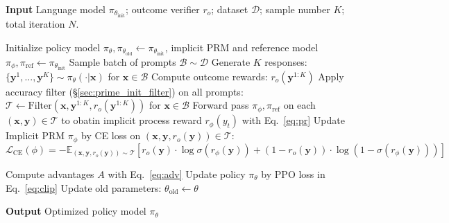 \begin{algorithm}[t]

\caption{Process Reinforcement through Implicit Rewards (PRIME)}
\textbf{Input} Language model $\pi_{\theta_{\text{init}}}$; outcome verifier $r_o$; dataset $\mathcal{D}$; sample number $K$; total iteration $N$.

\begin{algorithmic}[1]
\State Initialize policy model $\pi_\theta, \pi_{\theta_{\text{old}}} \leftarrow \pi_{\theta_{\text{init}}}$, implicit PRM and reference model $\pi_{\phi} ,\pi_{\text{ref}} \leftarrow \pi_{\theta_{\text{init}}}$
    \State Sample batch of prompts $\mathcal{B} \sim \mathcal{D}$
        \State Generate $K$ responses: $\{\mathbf{y}^1, ..., \mathbf{y}^K\} \sim \pi_\theta(\cdot|\mathbf{x})$ for $\mathbf{x} \in \mathcal{B}$
        \State Compute outcome rewards: $r_o\left(\mathbf{y}^{1:K}\right)$
        \State Apply accuracy filter (\S \ref{sec:prime_init_filter}) on all prompts: $\mathcal{T} \leftarrow \text{Filter}(\mathbf{x}, \mathbf{y}^{1:K}, r_o\left(\mathbf{y}^{1:K}\right))$ for $\mathbf{x} \in \mathcal{B}$
        \State Forward pass $\pi_\phi, \pi_\text{ref}$ on each $(\mathbf{x}, \mathbf{y}) \in \mathcal{T}$ to obatin implicit process reward $r_\phi(y_t)$ with Eq.~\ref{eq:pr} 
        \State Update Implicit PRM $\pi_\phi$ by CE loss on $(\mathbf{x}, \mathbf{y}, r_o\left(\mathbf{y}\right)) \in \mathcal{T}$:
            \[
            \mathcal{L}_{\text{CE}}(\phi) = -\mathbb{E}_{\left(\mathbf{x},\mathbf{y},r_o\left(\mathbf{y}\right)\right)\sim\mathcal{T}} \left[ r_o\left(\mathbf{y}\right) \cdot \log \sigma \left( r_\phi \left(\mathbf{y}\right) \right) + (1-r_o\left(\mathbf{y}\right)) \cdot \log\left( 1 - \sigma \left( r_\phi \left(\mathbf{y}\right) \right) \right) \right]
            \]

        \State Compute advantages $A$ with Eq.~\ref{eq:adv} %
        \State Update policy $\pi_\theta$ by PPO loss in Eq.~\ref{eq:clip}
    \State Update old parameters: $\theta_{\text{old}} \leftarrow \theta$%
\EndFor
\end{algorithmic}
\textbf{Output} Optimized policy model $\pi_\theta$
\label{algo:prime}
\end{algorithm}
\vspace{-5pt} %